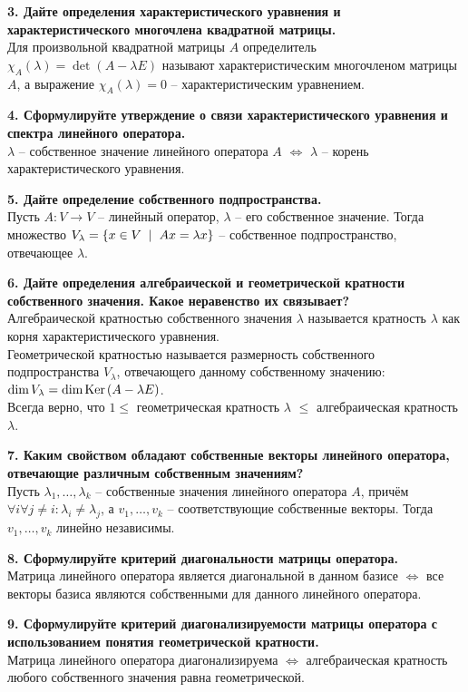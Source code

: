 \documentclass[11pt,a4paper]{article}
\newcommand{\Ker}[1]{\mathrm{Ker}\hspace{0.5mm}#1}
\newcommand{\Dim}[1]{\mathrm{dim}\hspace{0.5mm}#1}
\renewcommand{\mid}{\hspace{2mm}\middle|\hspace{2mm}}
\begin{document}
\textbf{3. Дайте определения характеристического уравнения и характеристического многочлена квадратной матрицы.\\}
Для произвольной квадратной матрицы $A$ определитель $\chi_A ( \lambda ) = \det (A - \lambda E)$ называют характеристическим многочленом матрицы $A$, а выражение $\chi_A ( \lambda ) = 0$ -- характеристическим уравнением.

\textbf{4. Сформулируйте утверждение о связи характеристического уравнения и спектра линейного оператора.\\}
$\lambda$ -- собственное значение линейного оператора $A$ $\Leftrightarrow$ $\lambda$ -- корень характеристического уравнения.

\textbf{5. Дайте определение собственного подпространства.\\}
Пусть $A: V \rightarrow V$ -- линейный оператор, $\lambda$ -- его собственное значение. Тогда множество $V_\lambda = \left\{ x \in V \mid Ax = \lambda x \right\}$ -- собственное подпространство, отвечающее $\lambda$.

\textbf{6. Дайте определения алгебраической и геометрической кратности собственного значения. Какое неравенство их связывает?\\}
Алгебраической кратностью собственного значения $\lambda$ называется кратность $\lambda$ как корня характеристического уравнения.\\
Геометрической кратностью называется размерность собственного подпространства $V_\lambda$, отвечающего данному собственному значению: $\Dim{V_\lambda} = \Dim{\Ker{(A - \lambda E)}}$.\\
Всегда верно, что $1 \leq $ геометрическая кратность $\lambda$ $\leq$ алгебраическая кратность $\lambda$.

\textbf{7. Каким свойством обладают собственные векторы линейного оператора, отвечающие различным собственным значениям?\\}
Пусть $\lambda_1, \hdots, \lambda_k$ -- собственные значения линейного оператора $A$, причём $\forall i \forall j \neq i: \lambda_i \neq \lambda_j$, а $v_1, \hdots, v_k$ -- соответствующие собственные векторы. Тогда $v_1, \hdots, v_k$ линейно независимы.

\textbf{8. Сформулируйте критерий диагональности матрицы оператора.\\}
Матрица линейного оператора является диагональной в данном базисе $\Leftrightarrow$ все векторы базиса являются собственными для данного линейного оператора.
\pagebreak

\textbf{9. Сформулируйте критерий диагонализируемости матрицы оператора с использованием понятия геометрической кратности.\\}
Матрица линейного оператора диагонализируема $\Leftrightarrow$ алгебраическая кратность любого собственного значения равна геометрической.
\end{document}
